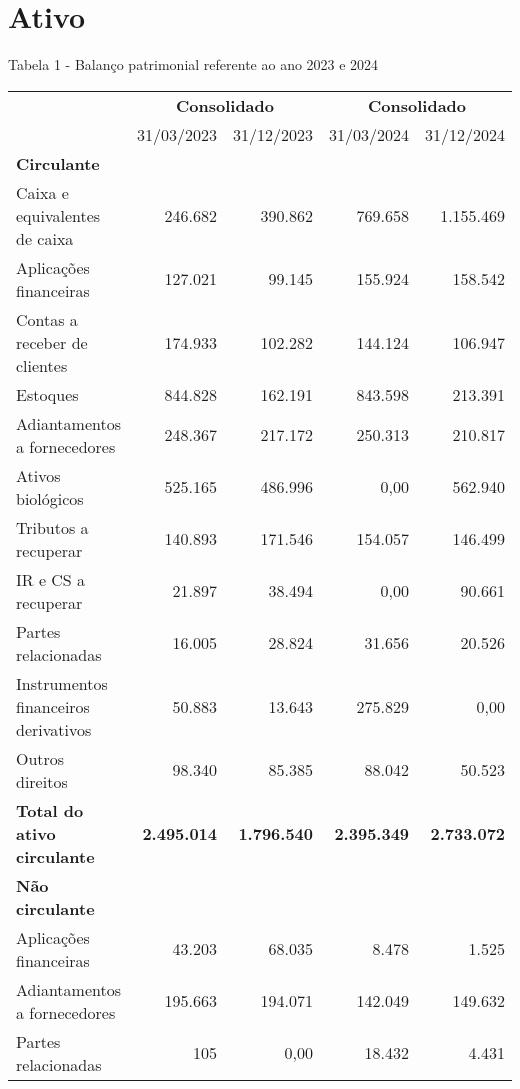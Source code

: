 \documentclass[1pt,a4paper]{article}
\begin{document}
		\centering\section*{Ativo}
		Tabela 1 - Balanço patrimonial referente ao ano 2023 e 2024
		\begin{longtable}{p{6cm}r r r r }
			\toprule
			& \multicolumn{2}{c}{\textbf{Consolidado}} & \multicolumn{2}{c}{\textbf{Consolidado}} \\
			\cmidrule(lr){2-3} \cmidrule(lr){4-5}
			& 31/03/2023 & 31/12/2023 & 31/03/2024 & 31/12/2024 \\
			\midrule
			\endhead
			\textbf{Circulante} & & & & \\
			Caixa e equivalentes de caixa & 246.682 & 390.862 & 769.658 & 1.155.469 \\
			Aplicações financeiras & 127.021 & 99.145 & 155.924 & 158.542 \\
			Contas a receber de clientes & 174.933 & 102.282 & 144.124 & 106.947 \\
			Estoques & 844.828 & 162.191 & 843.598 & 213.391 \\
			Adiantamentos a fornecedores & 248.367 & 217.172 & 250.313 & 210.817 \\
			Ativos biológicos & 525.165 & 486.996 & 0,00 & 562.940 \\
			Tributos a recuperar & 140.893 & 171.546 & 154.057 & 146.499 \\
			IR e CS a recuperar & 21.897 & 38.494 & 0,00 & 90.661 \\
			Partes relacionadas & 16.005 & 28.824 & 31.656 & 20.526 \\
			Instrumentos financeiros derivativos & 50.883 & 13.643 & 275.829 & 0,00 \\
			Outros direitos & 98.340 & 85.385 & 88.042 & 50.523 \\
			\rowcolor{darkgray}\textbf{Total do ativo circulante} & \textbf{2.495.014} & \textbf{1.796.540} & \textbf{2.395.349} & \textbf{2.733.072} \\
			\midrule
			\textbf{Não circulante} & & & & \\
			Aplicações financeiras & 43.203 & 68.035& 8.478 & 1.525 \\
			Adiantamentos a fornecedores & 195.663 & 194.071 & 142.049 & 149.632 \\
			Partes relacionadas & 105 & 0,00 & 18.432 & 4.431 \\

\end{longtable}
\end{document}
